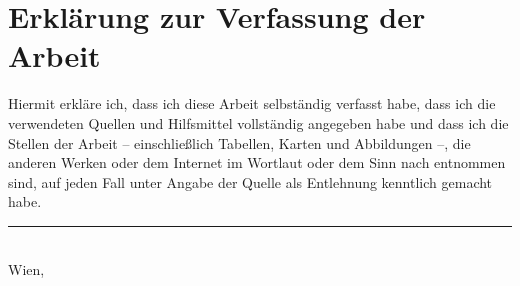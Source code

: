 \section*{Erkl\"arung zur Verfassung der Arbeit}

\vspace*{3ex}

\noindent
Hiermit erkl\"are ich, dass ich diese Arbeit selbst\"andig verfasst habe, dass ich die verwendeten Quellen und Hilfsmittel vollst\"andig angegeben habe und dass ich die Stellen der Arbeit -- einschließlich Tabellen, Karten und Abbildungen --, die anderen Werken oder dem Internet im Wortlaut oder dem Sinn nach entnommen sind, auf jeden Fall unter Angabe der Quelle als Entlehnung kenntlich gemacht habe.\\[5ex]

\noindent
\rule{8cm}{.5pt} \\
Wien, \spdate \\
\studname
